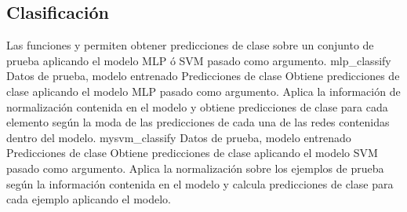 %
%
\subsection{Clasificación}
%
Las funciones  y  permiten
obtener predicciones de clase sobre un conjunto de prueba aplicando el
modelo MLP ó SVM pasado como argumento.
%
\funcentry
    {mlp\_classify}
    {Datos de prueba, modelo entrenado}
    {Predicciones de clase}
    {Obtiene predicciones de clase aplicando el modelo MLP pasado como
      argumento.
      Aplica la información de normalización contenida en el modelo y
      obtiene predicciones de clase para cada elemento según la moda
      de las predicciones de cada una de las redes contenidas dentro
      del modelo.}
%
\funcentry
    {mysvm\_classify}
    {Datos de prueba, modelo entrenado}
    {Predicciones de clase}
    {Obtiene predicciones de clase aplicando el modelo SVM pasado como
      argumento.
      Aplica la normalización sobre los ejemplos de prueba según la
      información contenida en el modelo y calcula predicciones de
      clase para cada ejemplo aplicando el modelo.}
%
